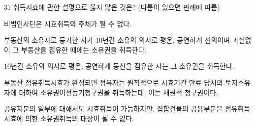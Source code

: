 \begin{question}{31}
취득시효에 관한 설명으로 옳지 않은 것은? (다툼이 있으면 판례에 따름)
\begin{choices}
  \item 비법인사단은 시효취득의 주체가 될 수 없다.
  \item 부동산의 소유자로 등기한 자가 10년간 소유의 의사로 평온, 공연하게 선의이며 과실없이 그 부동산을 점유한 때에는 소유권을 취득한다.
  \item 10년간 소유의 의사로 평온, 공연하게 동산을 점유한 자는 그 소유권을 취득한다.
  \item 부동산 점유취득시효가 완성되면 점유자는 원칙적으로 시효기간 만료 당시의 토지소유자에 대하여 소유권이전등기청구권을 취득하는데, 이는 채권적 청구권이다.
  \item 공유지분의 일부에 대해서도 시효취득이 가능하지만, 집합건물의 공용부분은 점유취득시효에 의한 소유권취득의 대상이 될 수 없다.
\end{choices}
\end{question}
